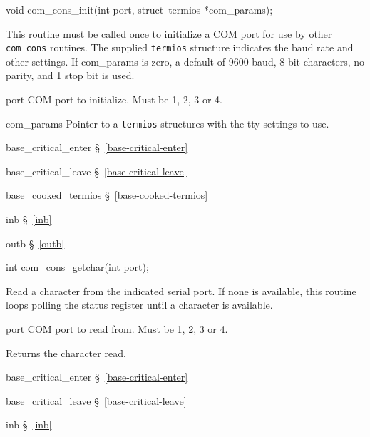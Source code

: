 \label{com-cons-init}
\begin{apisyn}

	\funcproto void com_cons_init(int port, struct~termios *com_params);
\end{apisyn}
\begin{apidesc}
	This routine must be called once to initialize a COM port for
	use by other {\tt com_cons} routines.
	The supplied {\tt termios} structure indicates
	the baud rate and other settings.
	If com_params is zero, a default of 9600 baud, 8 bit characters,
	no parity, and 1 stop bit is used.
\end{apidesc}
\begin{apiparm}
	\item[port]
		COM port to initialize.
		Must be 1, 2, 3 or 4.
	\item[com_params]
		Pointer to a {\tt termios} structures with the tty
		settings to use.
\end{apiparm}
\begin{apidep}
	\item[base_critical_enter]	\S~\ref{base-critical-enter}
	\item[base_critical_leave]	\S~\ref{base-critical-leave}
	\item[base_cooked_termios]	\S~\ref{base-cooked-termios}
	\item[inb]			\S~\ref{inb}
	\item[outb]			\S~\ref{outb}
\end{apidep}

\label{com-cons-getchar}
\begin{apisyn}

	\funcproto int com_cons_getchar(int port);
\end{apisyn}
\begin{apidesc}
	Read a character from the indicated serial port.
	If none is available, this routine loops polling the status
	register until a character is available.
\end{apidesc}
\begin{apiparm}
	\item[port]
		COM port to read from.
		Must be 1, 2, 3 or 4.
\end{apiparm}
\begin{apiret}
	Returns the character read.
\end{apiret}
\begin{apidep}
	\item[base_critical_enter]	\S~\ref{base-critical-enter}
	\item[base_critical_leave]	\S~\ref{base-critical-leave}
	\item[inb]	\S~\ref{inb}
\end{apidep}

